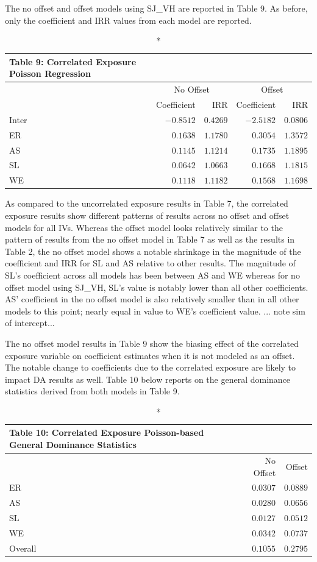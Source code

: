\documentclass[ShortAfour,times,sageapa]{sagej}
\begin{document}
	The no offset and offset models using SJ\_VH are reported in Table 9.
	As before, only the coefficient and IRR values from each model are reported.
	
	\begin{longtable}{l|rrrr}
		\caption*{
			{\large Table 9: Correlated Exposure Poisson Regression}
		} \\ 
		\toprule
		\multicolumn{1}{l}{} & \multicolumn{2}{c}{No Offset} & \multicolumn{2}{c}{Offset} \\ 
		\cmidrule(lr){2-3} \cmidrule(lr){4-5}
		\multicolumn{1}{l}{} & Coefficient & IRR & Coefficient & IRR \\ 
		\midrule
		Inter & $-0.8512$ & $0.4269$ & $-2.5182$ & $0.0806$ \\ 
		ER & $0.1638$ & $1.1780$ & $0.3054$ & $1.3572$ \\ 
		AS & $0.1145$ & $1.1214$ & $0.1735$ & $1.1895$ \\ 
		SL & $0.0642$ & $1.0663$ & $0.1668$ & $1.1815$ \\ 
		WE & $0.1118$ & $1.1182$ & $0.1568$ & $1.1698$ \\ 
		\bottomrule
	\end{longtable}
	
	As compared to the uncorrelated exposure results in Table 7, the correlated exposure results show different patterns of results across no offset and offset models for all IVs.
	Whereas the offset model looks relatively similar to the pattern of results from the no offset model in Table 7 as well as the results in Table 2, the no offset model shows a notable shrinkage in the magnitude of the coefficient and IRR for SL and AS relative to other results.
	The magnitude of SL's coefficient across all models has been between AS and WE whereas for no offset model using SJ\_VH, SL's value is notably lower than all other coefficients.
	AS' coefficient in the no offset model is also relatively smaller than in all other models to this point; nearly equal in value to WE's coefficient value.
	... note sim of intercept...
	
	The no offset model results in Table 9 show the biasing effect of the correlated exposure variable on coefficient estimates when it is not modeled as an offset.
	The notable change to coefficients due to the correlated exposure are likely to impact DA results as well.	
	Table 10 below reports on the general dominance statistics derived from both models in Table 9.
	
	\begin{longtable}{l|rr}
		\caption*{
			{\large Table 10: Correlated Exposure Poisson-based General Dominance Statistics}
		} \\ 
		\toprule
		\multicolumn{1}{l}{} & No Offset & Offset \\ 
		\midrule
		ER & $0.0307$ & $0.0889$ \\ 
		AS & $0.0280$ & $0.0656$ \\ 
		SL & $0.0127$ & $0.0512$ \\ 
		WE & $0.0342$ & $0.0737$ \\ 
		\midrule
		Overall & $0.1055$ & $0.2795$ \\ 
		\bottomrule
	\end{longtable}
\end{document}
